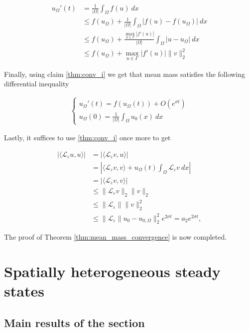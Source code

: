 \documentclass[12pt, a4paper]{article}
\theoremstyle{break}
\theoremstyle{break}
\theoremstyle{break}
\theoremstyle{break}
\theoremstyle{break}
\newcommand{\Leo}{\mathcal{L}_{\varepsilon}}
\begin{document}
\begin{align*}
    u_\Omega'(t) 
    &= \frac{1}{|\Omega|} \int_\Omega f(u)\:dx \\
    &\leq f(u_\Omega) + \frac{1}{|\Omega|} \int_\Omega \left|f(u) - f(u_\Omega)\right|\:dx \\
    &\leq f(u_\Omega) + \frac{\max_{u \in \Gamma} |f'(u)|}{|\Omega|} \int_\Omega |u - u_\Omega|\:dx \\
    &\leq f(u_\Omega) + \max_{u \in \Gamma} |f'(u)| \|v\|_2^2
\end{align*}

Finally, using claim \ref{thm:conv_i} we get that mean mass satisfies the following differential inequality

\begin{align*}
    \begin{cases}
        u_\Omega'(t) = f(u_\Omega(t)) + O(e^{\sigma t}) \\
        u_\Omega(0) = \frac{1}{|\Omega|}\int_\Omega u_0(x)\:dx
    \end{cases}    
\end{align*}

Lastly, it suffices to use \ref{thm:conv_i} once more to get

\begin{align*}
    \left| \langle \Leo u, u \rangle \right| &= \left| \langle \Leo v, u \rangle \right|\\
    &= \left| \langle \Leo v, v \rangle + u_\Omega(t) \int_\Omega \Leo v \:dx \right| \\
    &= \left|\langle \Leo v, v \rangle\right| \\
    &\leq \|\Leo v\|_2 \|v\|_2 \\
    &\leq \|\Leo \| \|v\|_2^2 \\
    &\leq \|\Leo\|u_0 - u_{0, \Omega}\|_2^2 e^{2\sigma t} = a_2 e^{2\sigma t},
\end{align*}

 
The proof of Theorem \ref{thm:mean_mass_convergence} is now completed.

\section{Spatially heterogeneous steady states} \label{sec:hetero_asymptotics}

\subsection{Main results of the section}
\end{document}
